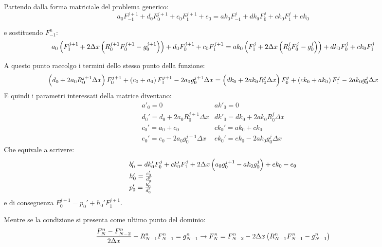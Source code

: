 Partendo dalla forma matriciale del problema generico:
\begin{equation}
  a_0  F_{-1}^{j+1} + d_0 F_{0}^{j+1} + c_{0}F_{1}^{j+1} + e_0 = 
  ak_0 F_{-1}^{j}   + dk_0 F_{0}^{j}  + ck_0 F_{1}^{j} + ek_0
\end{equation}

e sostituendo $F_{-1}^{n}$:
\begin{equation}
  a_0 \left(  F_{1}^{j+1} + 2 \Delta x \left( R_0^{j+1}F_{0}^{j+1}-g^{j+1}_0 \right) \right) +d_0 F_{0}^{j+1} +c_{0}F_{1}^{j+1} = 
  ak_0 \left( F_{1}^{j} + 2 \Delta x \left( R_0^jF_{0}^{j}-g^{j}_0 \right) \right) + dk_0 F_{0}^{j} + ck_0 F_{1}^{j}
\end{equation}

A questo punto raccolgo i termini dello stesso punto della funzione:
\begin{equation}
  \left( d_0 + 2 a_0 R_0^{j+1}\Delta x \right) F_0^{j+1} + \left( c_0+a_0 \right)F^{j+1}_1 
  - 2 a_0 g^{j+1}_0 \Delta x = 
  \left( dk_0 + 2 ak_0 R_0^{j}\Delta x \right) F_0^{j} + \left( ck_0+ak_0 \right)F^{j}_1 
  - 2 ak_0 g^j_0 \Delta x
\end{equation}
E quindi i parametri interessati della matrice diventano:
\begin{equation}
  \begin{array}{ll}
    a'_0 = 0 & ak'_0= 0\\
    d_0' = d_0 + 2 a_0 R_0^{j+1}\Delta x& dk'_0 = dk_0 + 2 ak_0 R_0^{j}\Delta x\\
    c_0' = a_0+c_0 & ck_0' = ak_0+ck_0\\
    e_0' = e_0 - 2 a_0  g^{j+1}_0 \Delta x & ek_0' = ek_0 - 2 ak_0  g^{j}_0 \Delta x
  \end{array}
\end{equation}
Che equivale a scrivere:
\begin{equation}
  \begin{array}{l}
    b_0' = dk'_0 F_0^j  + ck_0' F_1^j + 2 \Delta x \left( a_0 g^{j+1}_0-ak_0 g^j_0 \right)+ek_{0}-e_{0}\\
    h_0' = \frac{c_0'}{d_0'}\\
    p_0' = \frac{b_0'}{d_0'}
  \end{array}
\end{equation}
e di conseguenza $F_0^{j+1} = p_{0}' + h_0' F_1^{j+1}$.

Mentre se la condizione si presenta come ultimo punto del dominio:
\begin{equation}
  \frac{F_{N}^{n}-F_{N-2}^{n}}{2\Delta x} + R_{N-1}^nF_{N-1}^{n} = g_{N-1}^n  \to 
  F_{N}^{n} = F_{N-2}^{n} - 2\Delta x \left( R_{N-1}^nF_{N-1}^{n}-g^n_{N-1} \right)
\end{equation}

